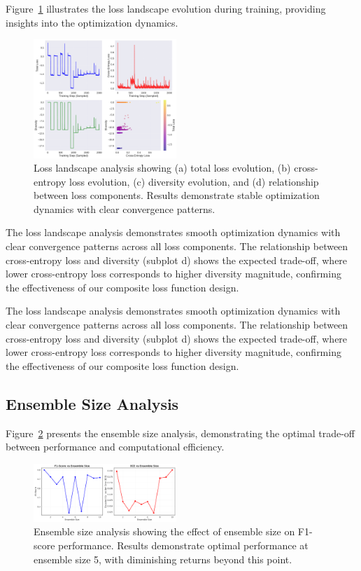 \documentclass[journal]{IEEEtran}
\begin{document}
Figure~\ref{fig:loss_landscape} illustrates the loss landscape evolution during training, providing insights into the optimization dynamics.

\begin{figure}[t]
\centering
\includegraphics[width=0.48\textwidth]{figures/loss_landscape.pdf}
\caption{Loss landscape analysis showing (a) total loss evolution, (b) cross-entropy loss evolution, (c) diversity evolution, and (d) relationship between loss components. Results demonstrate stable optimization dynamics with clear convergence patterns.}
\label{fig:loss_landscape}
\end{figure}

The loss landscape analysis demonstrates smooth optimization dynamics with clear convergence patterns across all loss components. The relationship between cross-entropy loss and diversity (subplot d) shows the expected trade-off, where lower cross-entropy loss corresponds to higher diversity magnitude, confirming the effectiveness of our composite loss function design.

The loss landscape analysis demonstrates smooth optimization dynamics with clear convergence patterns across all loss components. The relationship between cross-entropy loss and diversity (subplot d) shows the expected trade-off, where lower cross-entropy loss corresponds to higher diversity magnitude, confirming the effectiveness of our composite loss function design.

\subsection{Ensemble Size Analysis}

Figure~\ref{fig:ensemble_size_analysis} presents the ensemble size analysis, demonstrating the optimal trade-off between performance and computational efficiency.

\begin{figure}[t]
\centering
\includegraphics[width=0.48\textwidth]{figures/ensemble_size_analysis.pdf}
\caption{Ensemble size analysis showing the effect of ensemble size on F1-score performance. Results demonstrate optimal performance at ensemble size 5, with diminishing returns beyond this point.}
\label{fig:ensemble_size_analysis}
\end{figure}
\end{document}
